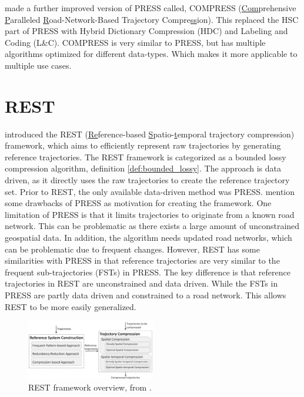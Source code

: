 \textcite{han2017compress} made a further improved version of PRESS called, COMPRESS (\underline{Com}prehensive \underline{P}aralleled \underline{R}oad-Network-Based Trajectory Compre\underline{ss}ion). This replaced the HSC part of PRESS with Hybrid Dictionary Compression (HDC) and Labeling and Coding (L\&C). COMPRESS is very similar to PRESS, but has multiple algorithms optimized for different data-types. Which makes it more applicable to multiple use cases.



\section{REST}
\label{sec:REST}
\textcite{zhao2018rest} introduced the REST (\underline{Re}ference-based \underline{S}patio-\underline{t}emporal trajectory compression) framework, which aims to efficiently represent raw trajectories by generating reference trajectories. The REST framework is categorized as a bounded lossy compression algorithm, definition \ref{def:bounded_lossy}. The approach is data driven, as it directly uses the raw trajectories to create the reference trajectory set. Prior to REST, the only available data-driven method was PRESS. \textcite{zhao2018rest} mention some drawbacks of PRESS as motivation for creating the framework. One limitation of PRESS is that it limits trajectories to originate from a known road network. This can be problematic as there exists a large amount of unconstrained geospatial data. In addition, the algorithm needs updated road networks, which can be problematic due to frequent changes. However, REST has some similarities with PRESS in that reference trajectories are very similar to the frequent sub-trajectories (FSTs) in PRESS. The key difference is that reference trajectories in REST are unconstrained and data driven. While the FSTs in PRESS are partly data driven and constrained to a road network. This allows REST to be more easily generalized.

\begin{figure}
    \includegraphics[width=0.5\textwidth]{./figures/rest_structure.png}
    \caption{REST framework overview, from \cite{zhao2018rest}.}
    \label{fig:rest_overview}
\end{figure}


